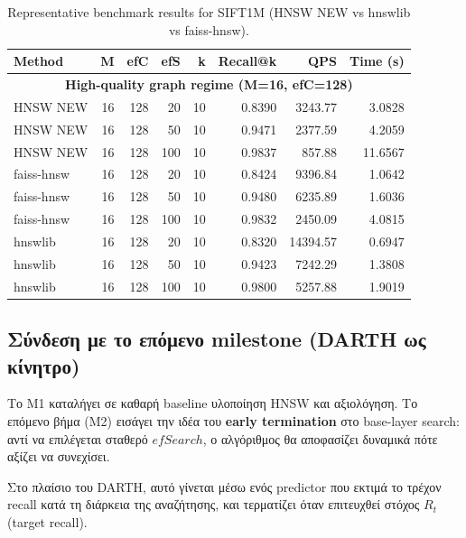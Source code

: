 \documentclass[12pt,a4paper]{article}
\begin{document}
\begin{table}[H]
\centering
\caption{Representative benchmark results for SIFT1M (HNSW NEW vs hnswlib vs faiss-hnsw).}
\label{tab:bench_sift1m_representative}

\begin{tabular}{lrrrrrrr}
\toprule
\textbf{Method} & \textbf{M} & \textbf{efC} & \textbf{efS} & \textbf{k} &
\textbf{Recall@k} & \textbf{QPS} & \textbf{Time (s)} \\
\midrule

\multicolumn{8}{c}{\textbf{High-quality graph regime (M=16, efC=128)}}\\
\midrule

HNSW NEW   & 16 & 128 & 20  & 10 & 0.8390 & 3243.77 & 3.0828 \\
HNSW NEW   & 16 & 128 & 50  & 10 & 0.9471 & 2377.59 & 4.2059 \\
HNSW NEW   & 16 & 128 & 100 & 10 & 0.9837 &  857.88 & 11.6567 \\

\midrule

faiss-hnsw & 16 & 128 & 20  & 10 & 0.8424 & 9396.84 & 1.0642 \\
faiss-hnsw & 16 & 128 & 50  & 10 & 0.9480 & 6235.89 & 1.6036 \\
faiss-hnsw & 16 & 128 & 100 & 10 & 0.9832 & 2450.09 & 4.0815 \\

\midrule

hnswlib    & 16 & 128 & 20  & 10 & 0.8320 & 14394.57 & 0.6947 \\
hnswlib    & 16 & 128 & 50  & 10 & 0.9423 & 7242.29 & 1.3808 \\
hnswlib    & 16 & 128 & 100 & 10 & 0.9800 & 5257.88 & 1.9019 \\

\bottomrule
\end{tabular}
\end{table}

\subsection{Σύνδεση με το επόμενο milestone (DARTH ως κίνητρο)}
Το M1 καταλήγει σε καθαρή baseline υλοποίηση HNSW και αξιολόγηση.
Το επόμενο βήμα (M2) εισάγει την ιδέα του \textbf{early termination} στο base-layer search:
αντί να επιλέγεται σταθερό $efSearch$, ο αλγόριθμος θα αποφασίζει δυναμικά πότε αξίζει να συνεχίσει.

Στο πλαίσιο του DARTH, αυτό γίνεται μέσω ενός predictor που εκτιμά το τρέχον recall κατά τη διάρκεια της αναζήτησης, και τερματίζει όταν επιτευχθεί στόχος $R_t$ (target recall).
\end{document}
